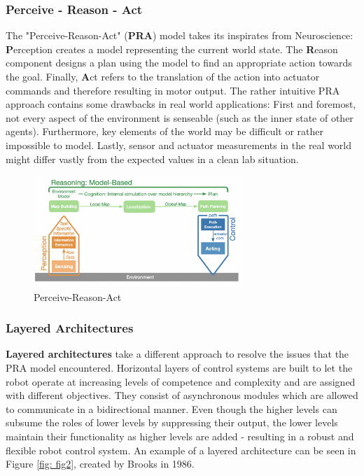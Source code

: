 \documentclass[]{article}
\begin{document}
	
	\subsubsection{Perceive - Reason - Act}
	The "Perceive-Reason-Act" (\textbf{PRA}) model takes its inspirates from Neuroscience: \textbf{P}erception creates a model representing the current world state. The \textbf{R}eason component designs a plan using the model to find an appropriate action towards the goal. Finally, \textbf{A}ct refers to the translation of the action into actuator commands and therefore resulting in motor output. \autocite{schillingAutonomeSystemeUnd2023} The rather intuitive PRA approach contains some drawbacks in real world applications: First and foremost, not every aspect of the environment is senseable (such as the inner state of other agents). Furthermore, key elements of the world may be difficult or rather impossible to model. Lastly, sensor and actuator measurements in the real world might differ vastly from the expected values in a clean lab situation. \autocite{schillingAutonomeSystemeUnd2023}
	
	\begin{figure}[ht] 
		\centering
		\includegraphics[width=0.7\textwidth]{Graphics/PRA}
		\caption{Perceive-Reason-Act \autocite{schillingAutonomeSystemeUnd2023}}
		\label{fig: fig1}
	\end{figure}
	
	\subsubsection{Layered Architectures}
	\textbf{Layered architectures} take a different approach to resolve the issues that the PRA model encountered. Horizontal layers of control systems are built to let the robot operate at increasing levels of competence and complexity and are assigned with different objectives. They consist of asynchronous modules which are allowed to communicate in a bidirectional manner. \autocite{brooksRobustLayeredControl1986} 
	Even though the higher levels can subsume the roles of lower levels by suppressing their output, the lower levels maintain their functionality as higher levels are added - resulting in a robust and flexible robot control system. \autocite{brooksRobustLayeredControl1986} An example of a layered architecture can be seen in Figure \ref{fig: fig2}, created by Brooks in 1986. \autocite{brooksRobustLayeredControl1986}
	
\end{document}
